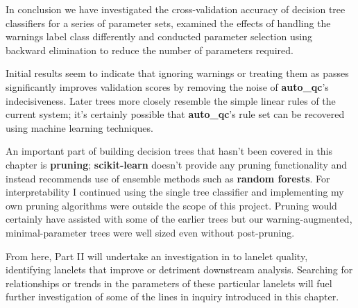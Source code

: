 In conclusion we have investigated the cross-validation accuracy of decision
tree classifiers for a series of parameter sets, examined the effects of
handling the warnings label class differently and conducted parameter selection
using backward elimination to reduce the number of parameters required.

Initial results seem to indicate that ignoring warnings or treating them as
passes significantly improves validation scores by removing the noise of
\textbf{auto\_qc}'s indecisiveness. Later trees more closely resemble
the simple linear rules of the current system; it's certainly possible that
\textbf{auto\_qc}'s rule set can be recovered using machine learning techniques.

An important part of building decision trees that hasn't been covered in this
chapter is \textbf{pruning}; \textbf{scikit-learn} doesn't provide any pruning
functionality and instead recommends use of ensemble methods such as
\textbf{random forests}. For interpretability I continued using the single tree
classifier and implementing my own pruning algorithms were outside the scope of
this project. Pruning would certainly have assisted with some of the earlier
trees but our warning-augmented, minimal-parameter trees were well sized even
without post-pruning.

From here, Part II will undertake an investigation in to lanelet quality,
identifying lanelets that improve or detriment downstream analysis. Searching
for relationships or trends in the parameters of these particular lanelets will
fuel further investigation of some of the lines in inquiry introduced in this
chapter.

